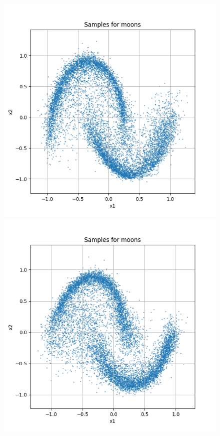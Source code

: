\documentclass[a4paper,12pt]{article}
\begin{document}
\begin{figure}[H]
  \begin{minipage}{0.3\textwidth}
      \centering
      \includegraphics[width=\linewidth]{"images/Samples for ddpm_2_200_0.001_0.05_moons_linear.png"}
  \end{minipage}
  \begin{minipage}{0.3\textwidth}
      \centering
      \includegraphics[width=\linewidth]{"images/Samples for ddpm_2_200_0.0005_0.05_moons_linear.png"}

\end{minipage}
\end{figure}
\end{document}
